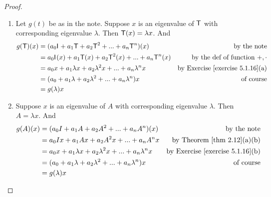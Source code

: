 \begin{proof} \ 

\begin{enumerate}
\item 
Let \(g(t)\) be as in the note.
Suppose \(x\) is an eigenvalue of \(\textsf{T}\) with corresponding eigenvalue \(\lambda\).
Then \(\textsf{T}(x) = \lambda x\).
And
\begin{align*}
    g(\T)(x) & = (a_0 \ITRAN{} + a_1 \T + a_2 \T^2 + ... + a_n \T^n)(x) & \text{by the note} \\
             & = a_0 \ITRAN{} (x) + a_1 \T (x) + a_2 \T^2 (x) + ... + a_n \T^n (x) & \text{by the def of function \(+, \cdot\)} \\
             & = a_0 x + a_1 \lambda x + a_2 \lambda^2 x + ... + a_n \lambda^n x & \text{by \EXEC{5.1.16}(a)} \\
             & = (a_0 + a_1 \lambda + a_2 \lambda^2 + ... + a_n \lambda^n) x & \text{of course} \\
             & = g(\lambda) x
\end{align*}

\item
Suppose \(x\) is an eigenvalue of \(A\) with corresponding eigenvalue \(\lambda\).
Then \(A = \lambda x\).
And
\begin{align*}
    g(A)(x) & = (a_0 I + a_1 A + a_2 A^2 + ... + a_n A^n)(x) & \text{by the note} \\
             & = a_0 I x + a_1 A x + a_2 A^2 x + ... + a_n A^n x & \text{by \THM{2.12}(a)(b)} \\
             & = a_0 x + a_1 \lambda x + a_2 \lambda^2 x + ... + a_n \lambda^n x & \text{by \EXEC{5.1.16}(b)} \\
             & = (a_0 + a_1 \lambda + a_2 \lambda^2 + ... + a_n \lambda^n) x & \text{of course} \\
             & = g(\lambda) x
\end{align*}


\end{enumerate}
\end{proof}
